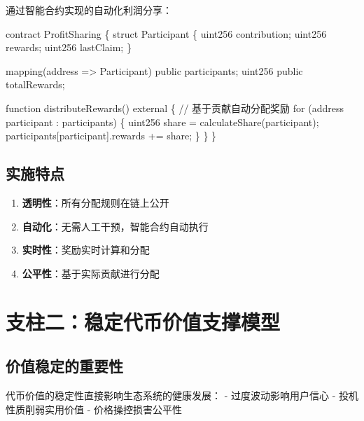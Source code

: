 \documentclass[
  Letterpaper,
]{scrbook}
\newenvironment{Shaded}{\begin{snugshade}}{\end{snugshade}}
\newcommand{\NormalTok}[1]{\textcolor[rgb]{0.00,0.23,0.31}{#1}}
\providecommand{\tightlist}{%
  \setlength{\itemsep}{0pt}\setlength{\parskip}{0pt}}
\begin{document}
通过智能合约实现的自动化利润分享：

\begin{Shaded}
\begin{Highlighting}[]
\NormalTok{contract ProfitSharing \{}
\NormalTok{    struct Participant \{}
\NormalTok{        uint256 contribution;}
\NormalTok{        uint256 rewards;}
\NormalTok{        uint256 lastClaim;}
\NormalTok{    \}}
    
\NormalTok{    mapping(address =\textgreater{} Participant) public participants;}
\NormalTok{    uint256 public totalRewards;}
    
\NormalTok{    function distributeRewards() external \{}
\NormalTok{        // 基于贡献自动分配奖励}
\NormalTok{        for (address participant : participants) \{}
\NormalTok{            uint256 share = calculateShare(participant);}
\NormalTok{            participants[participant].rewards += share;}
\NormalTok{        \}}
\NormalTok{    \}}
\NormalTok{\}}
\end{Highlighting}
\end{Shaded}

\subsection{实施特点}\label{ux5b9eux65bdux7279ux70b9}

\begin{enumerate}
\def\labelenumi{\arabic{enumi}.}
\tightlist
\item
  \textbf{透明性}：所有分配规则在链上公开
\item
  \textbf{自动化}：无需人工干预，智能合约自动执行
\item
  \textbf{实时性}：奖励实时计算和分配
\item
  \textbf{公平性}：基于实际贡献进行分配
\end{enumerate}

\section{支柱二：稳定代币价值支撑模型}\label{ux652fux67f1ux4e8cux7a33ux5b9aux4ee3ux5e01ux4ef7ux503cux652fux6491ux6a21ux578b}

\subsection{价值稳定的重要性}\label{ux4ef7ux503cux7a33ux5b9aux7684ux91cdux8981ux6027}

代币价值的稳定性直接影响生态系统的健康发展： - 过度波动影响用户信心 -
投机性质削弱实用价值 - 价格操控损害公平性
\end{document}
